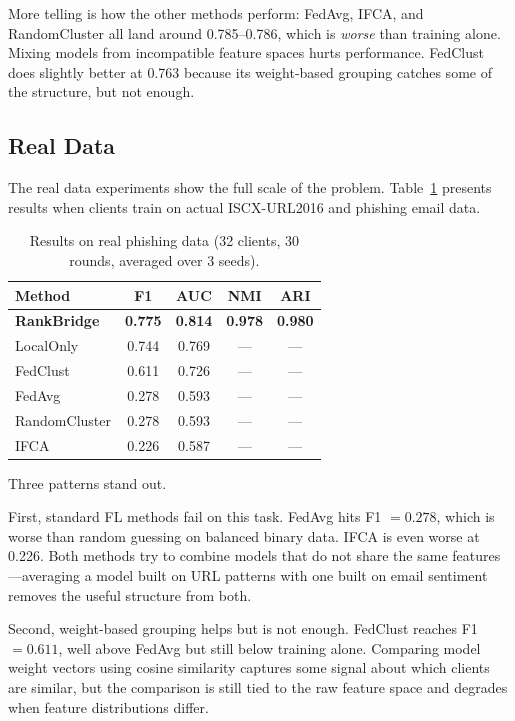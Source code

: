 \documentclass[information,article,submit,pdftex]{mdpi}
\begin{document}
More telling is how the other methods perform: FedAvg, IFCA, and RandomCluster
all land around 0.785--0.786, which is \textit{worse} than training alone. Mixing
models from incompatible feature spaces hurts performance. FedClust does slightly
better at 0.763 because its weight-based grouping catches some of the structure,
but not enough.

\subsection{Real Data}

The real data experiments show the full scale of the problem.
Table~\ref{tab:real_results} presents results when clients train on actual
ISCX-URL2016 and phishing email data.

\begin{table}[H]
\caption{Results on real phishing data (32 clients, 30 rounds, averaged over
  3 seeds).}\label{tab:real_results}
\begin{tabular}{lcccc}
\toprule
\textbf{Method} & \textbf{F1} & \textbf{AUC} & \textbf{NMI} & \textbf{ARI} \\
\midrule
\textbf{RankBridge} & \textbf{0.775} & \textbf{0.814} & \textbf{0.978} &
  \textbf{0.980} \\
LocalOnly           & 0.744 & 0.769 & --- & --- \\
FedClust            & 0.611 & 0.726 & --- & --- \\
FedAvg              & 0.278 & 0.593 & --- & --- \\
RandomCluster       & 0.278 & 0.593 & --- & --- \\
IFCA                & 0.226 & 0.587 & --- & --- \\
\bottomrule
\end{tabular}
\end{table}

Three patterns stand out.

First, standard FL methods fail on this task. FedAvg hits F1 $= 0.278$, which is
worse than random guessing on balanced binary data. IFCA is even worse at 0.226.
Both methods try to combine models that do not share the same features---averaging
a model built on URL patterns with one built on email sentiment removes the useful
structure from both.

Second, weight-based grouping helps but is not enough. FedClust reaches
F1 $= 0.611$, well above FedAvg but still below training alone. Comparing model
weight vectors using cosine similarity captures some signal about which clients
are similar, but the comparison is still tied to the raw feature space and
degrades when feature distributions differ.
\end{document}

